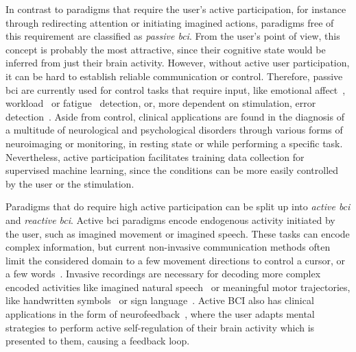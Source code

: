 In contrast to paradigms that require the user's active participation, for
instance through redirecting attention or initiating imagined actions,
pa\-ra\-digms free of this requirement are classified as \emph{passive \ac{bci}}.
From the user's point of view, this concept is probably the most attractive, since their
cognitive state would be inferred from just their brain activity.
However, without active user participation, it can be hard to establish reliable
communication or control.
Therefore, passive \ac{bci} are currently used for control tasks that require
input, like emotional affect~\cite{Torres2020,Libert2019, Muehl2014},
workload~\cite{Zanetti2021} or fatigue~\cite{Alimardani2020} detection,
or, more dependent on stimulation, error detection~\cite{SiMohammed2020}.
Aside from control, clinical applications are found in the diagnosis of a multitude of neurological
and psychological disorders through various forms of neuroimaging or monitoring,
in resting state or while performing a specific task.
Nevertheless, active participation facilitates training data collection for supervised
machine learning, since the conditions can be more easily controlled by the user or the
stimulation.

Paradigms that do require high active participation can be split up into \emph{active
\ac{bci}} and \emph{reactive \ac{bci}}.
Active \ac{bci} paradigms encode endogenous activity initiated by the user, such as
imagined movement or imagined speech.
These tasks can encode complex information, but current non-invasive communication
methods often limit the considered domain to a few movement directions to control a
cursor, or a few words~\cite{Panachakel2021}.
Invasive recordings are necessary for decoding more complex encoded activities like
imagined natural speech~\cite{Metzger2023} or meaningful motor trajectories, like handwritten
symbols~\cite{Willett2021} or sign language~\cite{Branco2017}.
Active BCI also has clinical applications in the form of
neurofeedback~\cite{Hammond2011}, where the user adapts mental strategies to
perform active self-regulation of their brain activity which is presented to
them, causing a feedback loop.

